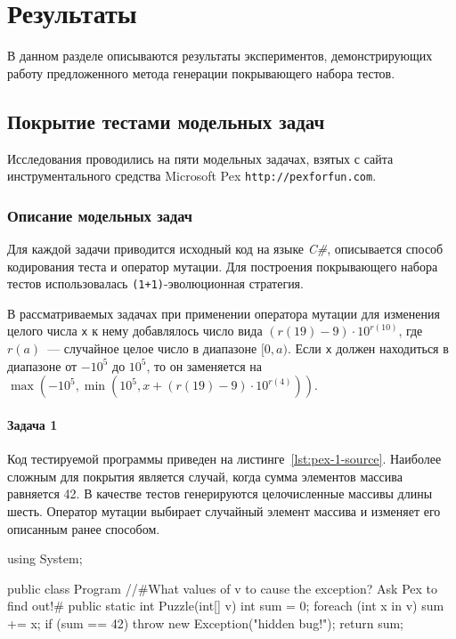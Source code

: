\chapter{Результаты} 
\label{chapter3}

В данном разделе описываются результаты экспериментов, демонстрирующих работу предложенного метода генерации покрывающего набора тестов. 

\section{Покрытие тестами модельных задач}
Исследования проводились на пяти модельных задачах, взятых с сайта инструментального средства Microsoft Pex \texttt{http://pexforfun.com}. 

\subsection{Описание модельных задач}
Для каждой задачи приводится исходный код на языке \textit{C\#}, описывается способ кодирования теста и оператор мутации. Для построения покрывающего набора 
тестов использовалась \texttt{(1+1)}-эволюционная стратегия.

В рассматриваемых задачах при применении оператора мутации для изменения целого числа \texttt{x} к нему добавлялось число вида $(r(19) - 9) \cdot 10 ^{r(10)}$, 
где $r(a)$~--- случайное целое число в диапазоне $[0, a)$. Если \texttt{x} должен находиться в диапазоне от $-10^5$ до $10^5$, то он заменяется на $\max(-10^5, 
\min(10^5, x + (r(19) - 9) \cdot 10^{r(4)}))$. 

\subsubsection{Задача 1}
\label{pex01}
Код тестируемой программы приведен на листинге~\ref{lst:pex-1-source}. Наиболее сложным для покрытия является случай, когда сумма элементов массива равняется 
42. В качестве тестов генерируются целочисленные массивы длины шесть. Оператор мутации выбирает случайный элемент массива и изменяет его описанным ранее 
способом.

\begin{snippet}[language=C++,caption={Код задачи 1 с сайта pexforfun},label={lst:pex-1-source}]
using System;

public class Program {
  //#What values of v to cause the exception? Ask Pex to find out!#
  public static int Puzzle(int[] v) {
    int sum = 0;
    foreach (int x in v)
      sum += x;
    if (sum == 42)
      throw new Exception("hidden bug!");
    return sum;
  }
}
\end{snippet}

